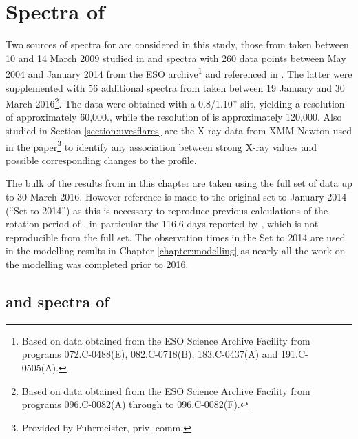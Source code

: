 \chapter{Spectra of \prox}
\protect\label{chapter:proxima}

Two sources of spectra for {\prox} are considered in this study, those from {\uves} taken between 10 and 14 March 2009
studied in \citet{fuhrmeister11} and {\harps} spectra with 260 data points between May 2004 and January 2014 from the
ESO archive\footnote{Based on data obtained from the ESO Science Archive Facility from programs 072.C-0488(E),
  082.C-0718(B), 183.C-0437(A) and 191.C-0505(A).} and referenced in \citet[Table 3]{suarezmascareno15}. The latter were
supplemented with 56 additional spectra from {\harps} taken between 19 January and 30 March 2016\footnote{Based on data obtained
  from the ESO Science Archive Facility from programs 096.C-0082(A) through to 096.C-0082(F).}. The {\uves} data were
obtained with a 0.8/1.10'' slit, yielding a resolution of approximately 60,000., while the resolution of {\harps} is
approximately 120,000. Also studied in Section \ref{section:uvesflares} are the X-ray data from XMM-Newton used in the
\citet{fuhrmeister11} paper\footnote{Provided by Fuhrmeister, priv. comm.} to identify any association between strong
X-ray values and possible corresponding changes to the {\ha} profile.

The bulk of the results from {\harps} in this chapter are taken using the full set of data up to 30 March 2016. However
reference is made to the original set to January 2014 (``Set to 2014'') as this is necessary to reproduce previous
calculations of the rotation period of \prox, in particular the 116.6 days reported by \citet[Table 3]{suarezmascareno15},
 which is not reproducible from the full set. The observation times in the Set to 2014 are used in the modelling results
in Chapter \ref{chapter:modelling} as nearly all the work on the modelling was completed prior to 2016.

\section{{\harps} and {\uves} spectra of \prox}


